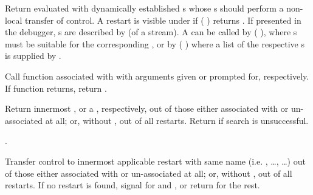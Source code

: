 \begin{LIST}{1cm}
  {
    Return  evaluated with dynamically
    established s whose s should
    perform a non-local transfer of control.  A restart is visible
    under  if ( )
    returns \T.  If presented in the debugger, s are
    described by  (of a stream).  A
     can be called by ( 
    ), where s must be suitable for the
    corresponding , or by
    ( ) where a list of
    the respective s is supplied by .
  }

  {
    Call function associated with  with arguments given
    or prompted for, respectively. If  function returns,
    return .
  }

  {
    Return innermost  , or a , respectively, out of those either associated with
     or un-associated at all; or, without
    , out of all restarts. Return \retval{\NIL} if
    search is unsuccessful.
  }

  {
  .
  }

  {
  Transfer control to innermost applicable restart with same name
  (i.e. , \ldots,  \ldots) out of those either associated
  with  or un-associated at all; or, without
  , out of all restarts. If no restart is found,
  signal  for  and ,
  or return \retval{\NIL} for the rest.
  }


\end{LIST}
